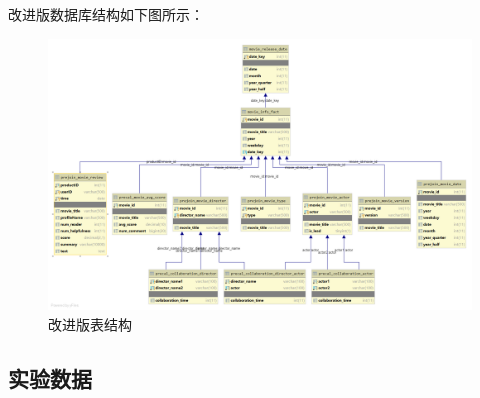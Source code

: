 \documentclass{ctexrep}
\begin{document}
    改进版数据库结构如下图所示：
    \begin{figure}[H]
		\centering
		\includegraphics[width=0.7\linewidth]{img/MySQL_DB2.png}
		\caption{改进版表结构}
		\label{fig:MySQL_DB3}
	\end{figure}
	\subsection{实验数据}
\end{document}
